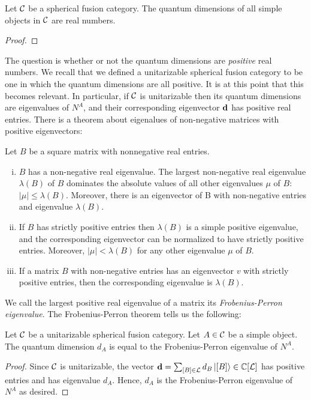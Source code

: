 \begin{cor} Let ${\mathcal C}$ be a spherical fusion category. The quantum dimensions of all simple objects in ${\mathcal C}$ are real numbers.
\end{cor}
\begin{proof}
\end{proof}

The question is whether or not the quantum dimensions are \textit{positive} real numbers. We recall that we defined a unitarizable spherical fusion category to be one in which the quantum dimensions are all positive. It is at this point that this becomes relevant. In particular, if ${\mathcal C}$ is unitarizable then its quantum dimensions are eigenvalues of $N^A$, and their corresponding eigenvector $\bold{d}$ has positive real entries. There is a theorem about eigenalues of non-negative matrices with positive eigenvectors:

\begin{thrm} Let $B$ be a square matrix with nonnegative real entries.

\begin{enumerate}[(i)]
\item $B$ has a non-negative real eigenvalue. The largest non-negative real eigenvalue $\lambda(B)$ of $B$ dominates the absolute values of all other eigenvalues $\mu$ of $B$: $|\mu|\leq \lambda(B)$. Moreover, there is an eigenvector of B with non-negative entries
and eigenvalue $\lambda(B)$.
\item If $B$ has strictly positive entries then $\lambda(B)$ is a simple positive eigenvalue, and the corresponding eigenvector can be normalized to have strictly positive entries. Moreover, $|\mu| < \lambda(B)$ for any other eigenvalue $\mu$ of $B$.
\item If a matrix $B$ with non-negative entries has an eigenvector $v$ with strictly
positive entries, then the corresponding eigenvalue is $\lambda(B)$.
\end{enumerate}
\end{thrm}

We call the largest positive real eigenvalue of a matrix its \textit{Frobenius-Perron eigenvalue}. The Frobenius-Perron theorem tells us the following:

\begin{cor} Let ${\mathcal C}$ be a unitarizable spherical fusion category. Let $A\in {\mathcal C}$ be a simple object. The quantum dimension $d_A$ is equal to the Frobenius-Perron eigenvalue of $N^A$.
\end{cor}
\begin{proof} Since ${\mathcal C}$  is unitarizable, the vector $\bold{d} = \sum_{[B]\in {\mathcal L}} d_{B}\ket{[B]}\in {\mathbb C}[{\mathcal L}]$ has positive entries and has eigenvalue $d_A$. Hence, $d_A$ is the Frobenius-Perron eigenvalue of $N^A$ as desired.
\end{proof}

